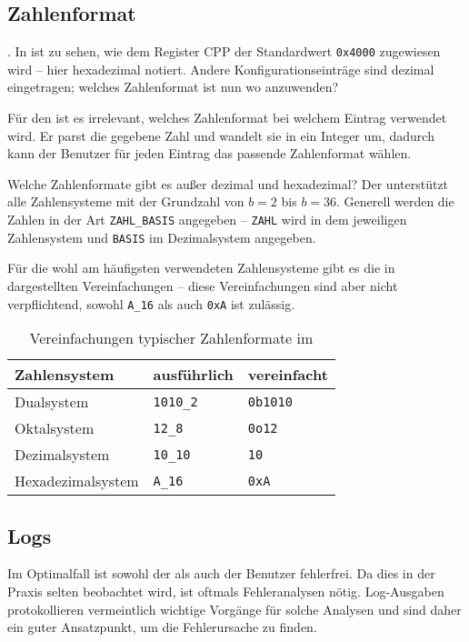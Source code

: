\subsection{Zahlenformat}
.
In  ist zu sehen, wie dem Register CPP der Standardwert \texttt{0x4000} zugewiesen wird -- hier hexadezimal notiert. Andere Konfigurationseinträge sind dezimal eingetragen; welches Zahlenformat ist nun wo anzuwenden?

Für den \md{} ist es irrelevant, welches Zahlenformat bei welchem Eintrag verwendet wird. Er parst die gegebene Zahl und wandelt sie in ein Integer um, dadurch kann der Benutzer für jeden Eintrag das passende Zahlenformat wählen.

Welche Zahlenformate gibt es außer dezimal und hexadezimal? Der \md{} unterstützt alle Zahlensysteme mit der Grundzahl von $b=2$ bis $b=36$. Generell werden die Zahlen in der Art \texttt{ZAHL\_BASIS} angegeben -- \texttt{ZAHL} wird in dem jeweiligen Zahlensystem und \texttt{BASIS} im Dezimalsystem angegeben.

Für die wohl am häufigsten verwendeten Zahlensysteme gibt es die in  dargestellten Vereinfachungen -- diese Vereinfachungen sind aber nicht verpflichtend, sowohl \texttt{A\_16} als auch \texttt{0xA} ist zulässig.

\begin{table}[h]
  \centering
  \begin{tabular}[h]{|lll|}
    \hline
    Zahlensystem      & ausführlich      & vereinfacht     \\
    \hline
    Dualsystem        & \texttt{1010\_2} & \texttt{0b1010} \\
    Oktalsystem       & \texttt{12\_8}   & \texttt{0o12}   \\
    Dezimalsystem     & \texttt{10\_10}  & \texttt{10}     \\
    Hexadezimalsystem & \texttt{A\_16}   & \texttt{0xA}    \\
    \hline
  \end{tabular}
  \caption{Vereinfachungen typischer Zahlenformate im \md{}}
\end{table}

\subsection{Logs}
Im Optimalfall ist sowohl der \md{} als auch der Benutzer fehlerfrei. Da dies in der Praxis selten beobachtet wird, ist oftmals Fehleranalysen nötig. Log-Ausgaben protokollieren vermeintlich wichtige Vorgänge für solche Analysen und sind daher ein guter Ansatzpunkt, um die Fehlerursache zu finden.

